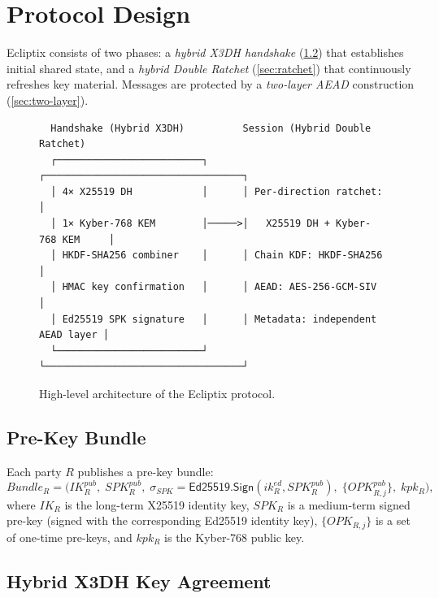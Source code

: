 \documentclass[11pt,a4paper]{article}
\theoremstyle{definition}
\newcommand{\IK}{\mathit{IK}}
\newcommand{\SPK}{\mathit{SPK}}
\newcommand{\OPK}{\mathit{OPK}}
\begin{document}
\section{Protocol Design}\label{sec:protocol}

Ecliptix consists of two phases: a \emph{hybrid X3DH handshake} (\cref{sec:handshake}) that establishes initial shared state, and a \emph{hybrid Double Ratchet} (\cref{sec:ratchet}) that continuously refreshes key material. Messages are protected by a \emph{two-layer AEAD} construction (\cref{sec:two-layer}).

\begin{figure}[t]
\centering
\begin{minipage}{0.95\textwidth}
\begin{verbatim}
  Handshake (Hybrid X3DH)          Session (Hybrid Double Ratchet)
  ┌─────────────────────────┐      ┌──────────────────────────────────┐
  │ 4× X25519 DH            │      │ Per-direction ratchet:           │
  │ 1× Kyber-768 KEM        │─────>│   X25519 DH + Kyber-768 KEM     │
  │ HKDF-SHA256 combiner    │      │ Chain KDF: HKDF-SHA256           │
  │ HMAC key confirmation   │      │ AEAD: AES-256-GCM-SIV           │
  │ Ed25519 SPK signature   │      │ Metadata: independent AEAD layer │
  └─────────────────────────┘      └──────────────────────────────────┘
\end{verbatim}
\end{minipage}
\caption{High-level architecture of the Ecliptix protocol.}\label{fig:architecture}
\end{figure}

\subsection{Pre-Key Bundle}\label{sec:bundle}

Each party $R$ publishes a pre-key bundle:
\[
  \mathit{Bundle}_R = \bigl(\IK_R^{\mathit{pub}},\; \SPK_R^{\mathit{pub}},\; \sigma_{\SPK} = \textsf{Ed25519.Sign}(ik_R^{\mathit{ed}}, \SPK_R^{\mathit{pub}}),\; \{\OPK_{R,j}^{\mathit{pub}}\},\; kpk_R\bigr),
\]
where $\IK_R$ is the long-term X25519 identity key, $\SPK_R$ is a medium-term signed pre-key (signed with the corresponding Ed25519 identity key), $\{\OPK_{R,j}\}$ is a set of one-time pre-keys, and $kpk_R$ is the Kyber-768 public key.

\subsection{Hybrid X3DH Key Agreement}\label{sec:handshake}
\end{document}
